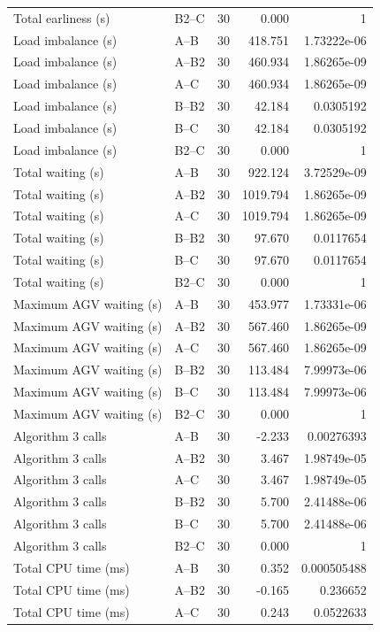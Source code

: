 \begin{table}[t]
\begin{tabular}{llrrr}
Total earliness (s) & B2--C & 30 & 0.000 & 1 \\
Load imbalance (s) & A--B & 30 & 418.751 & 1.73222e-06 \\
Load imbalance (s) & A--B2 & 30 & 460.934 & 1.86265e-09 \\
Load imbalance (s) & A--C & 30 & 460.934 & 1.86265e-09 \\
Load imbalance (s) & B--B2 & 30 & 42.184 & 0.0305192 \\
Load imbalance (s) & B--C & 30 & 42.184 & 0.0305192 \\
Load imbalance (s) & B2--C & 30 & 0.000 & 1 \\
Total waiting (s) & A--B & 30 & 922.124 & 3.72529e-09 \\
Total waiting (s) & A--B2 & 30 & 1019.794 & 1.86265e-09 \\
Total waiting (s) & A--C & 30 & 1019.794 & 1.86265e-09 \\
Total waiting (s) & B--B2 & 30 & 97.670 & 0.0117654 \\
Total waiting (s) & B--C & 30 & 97.670 & 0.0117654 \\
Total waiting (s) & B2--C & 30 & 0.000 & 1 \\
Maximum AGV waiting (s) & A--B & 30 & 453.977 & 1.73331e-06 \\
Maximum AGV waiting (s) & A--B2 & 30 & 567.460 & 1.86265e-09 \\
Maximum AGV waiting (s) & A--C & 30 & 567.460 & 1.86265e-09 \\
Maximum AGV waiting (s) & B--B2 & 30 & 113.484 & 7.99973e-06 \\
Maximum AGV waiting (s) & B--C & 30 & 113.484 & 7.99973e-06 \\
Maximum AGV waiting (s) & B2--C & 30 & 0.000 & 1 \\
Algorithm 3 calls & A--B & 30 & -2.233 & 0.00276393 \\
Algorithm 3 calls & A--B2 & 30 & 3.467 & 1.98749e-05 \\
Algorithm 3 calls & A--C & 30 & 3.467 & 1.98749e-05 \\
Algorithm 3 calls & B--B2 & 30 & 5.700 & 2.41488e-06 \\
Algorithm 3 calls & B--C & 30 & 5.700 & 2.41488e-06 \\
Algorithm 3 calls & B2--C & 30 & 0.000 & 1 \\
Total CPU time (ms) & A--B & 30 & 0.352 & 0.000505488 \\
Total CPU time (ms) & A--B2 & 30 & -0.165 & 0.236652 \\
Total CPU time (ms) & A--C & 30 & 0.243 & 0.0522633 \\

\end{tabular}
\end{table}

